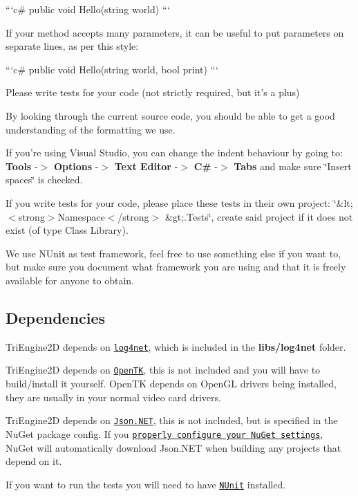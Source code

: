 ```c\# public void Hello(string world) ```


\begin{DoxyItemize}
\item If your method accepts many parameters, it can be useful to put parameters on separate lines, as per this style\-:
\end{DoxyItemize}

```c\# public void Hello(string world, bool print) ```


\begin{DoxyItemize}
\item Please write tests for your code (not strictly required, but it's a plus)
\end{DoxyItemize}

By looking through the current source code, you should be able to get a good understanding of the formatting we use.

If you're using Visual Studio, you can change the indent behaviour by going to\-: {\bfseries Tools} -\/$>$ {\bfseries Options} -\/$>$ {\bfseries Text Editor} -\/$>$ {\bfseries C\#} -\/$>$ {\bfseries Tabs} and make sure \char`\"{}\-Insert spaces\char`\"{} is checked.

If you write tests for your code, please place these tests in their own project\-: \char`\"{}\&lt; $<$strong$>$\-Namespace$<$/strong$>$ \&gt;.\-Tests\char`\"{}, create said project if it does not exist (of type Class Library).

We use N\-Unit as test framework, feel free to use something else if you want to, but make sure you document what framework you are using and that it is freely available for anyone to obtain.

\subsection*{Dependencies}

Tri\-Engine2\-D depends on \href{http://logging.apache.org/log4net/}{\tt log4net}, which is included in the {\bfseries libs/log4net} folder.

Tri\-Engine2\-D depends on \href{http://www.opentk.com/}{\tt Open\-T\-K}, this is not included and you will have to build/install it yourself. Open\-T\-K depends on Open\-G\-L drivers being installed, they are usually in your normal video card drivers.

Tri\-Engine2\-D depends on \href{http://json.codeplex.com/}{\tt Json.\-N\-E\-T}, this is not included, but is specified in the Nu\-Get package config. If you \href{http://docs.nuget.org/docs/workflows/using-nuget-without-committing-packages#Using_NuGet_without_committing_packages_to_source_control}{\tt properly configure your Nu\-Get settings}, Nu\-Get will automatically download Json.\-N\-E\-T when building any projects that depend on it.

If you want to run the tests you will need to have \href{http://www.nunit.org/}{\tt N\-Unit} installed. 